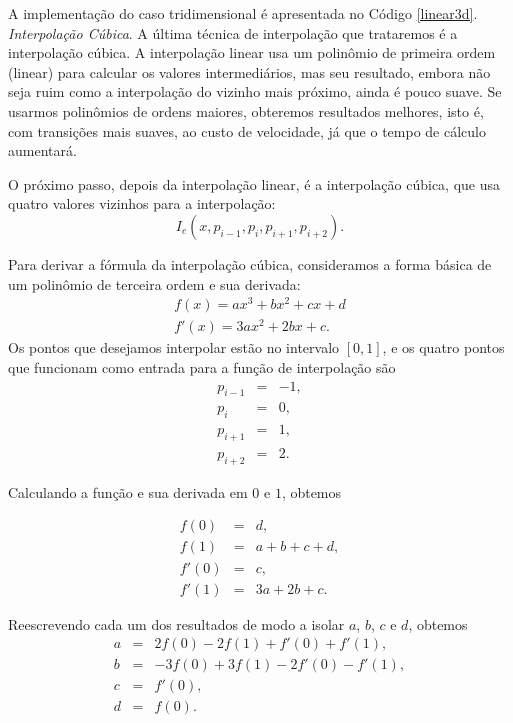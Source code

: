 \documentclass[12pt, a4paper, oneside]{book}
\begin{document}
A implementação do caso tridimensional é apresentada no Código \ref{linear3d}. \\



\emph{Interpolação Cúbica}. A última técnica de interpolação que trataremos é a interpolação cúbica. A interpolação linear usa um polinômio de primeira ordem (linear) para calcular os valores intermediários, mas seu resultado, embora não seja ruim como a interpolação do vizinho mais próximo, ainda é pouco suave. Se usarmos polinômios de ordens maiores, obteremos resultados melhores, isto é, com transições mais suaves, ao custo de velocidade, já que o tempo de cálculo aumentará. 

O próximo passo, depois da interpolação linear, é a interpolação cúbica, que usa quatro valores vizinhos para a interpolação:
\[
 I_{c} (x, p_{i-1}, p_{i}, p_{i+1}, p_{i+2}).
\]  

Para derivar a fórmula da interpolação cúbica, consideramos a forma básica de um polinômio de terceira ordem e sua derivada:
\[
\begin{array}{l}
	f(x) = ax^3 + bx^2 + cx + d \\
f'(x) = 3ax^2 + 2bx + c.
\end{array}
\]
Os pontos que desejamos interpolar estão no intervalo $[0, 1]$, e os quatro pontos que funcionam como entrada para a função de interpolação são
\[
\begin{array}{rcl}
p_{i-1} & = & -1, \\
p_{i} & = & 0, \\
p_{i+1} & = & 1, \\
p_{i+2} & = & 2.
\end{array} 
\]

Calculando a função e sua derivada em $0$ e $1$, obtemos

\[
\begin{array}{rcl}
f(0) & = & d, \\
f(1) & = & a + b + c + d, \\
f'(0) & = & c, \\
f'(1) & = & 3a + 2b + c.
\end{array} 
\]

Reescrevendo cada um dos resultados de modo a isolar $a$, $b$, $c$ e $d$, obtemos
\[
\begin{array}{rcl}
a & = & 2f(0) - 2f(1) + f'(0) + f'(1), \\
b & = & -3f(0) + 3f(1) - 2f'(0) - f'(1), \\
c & = & f'(0), \\
d & = & f(0).
\end{array} 
\]
\end{document}
